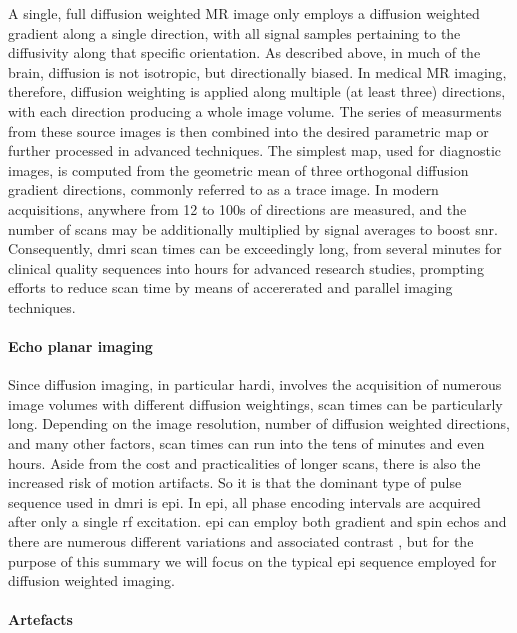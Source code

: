 A single, full diffusion weighted MR image only employs a diffusion weighted gradient along a single direction, with all signal samples pertaining to the diffusivity along that specific orientation.
As described above, in much of the brain, diffusion is not isotropic, but directionally biased.
In medical MR imaging, therefore, diffusion weighting is applied along multiple (at least three) directions, with each direction producing a whole image volume.
The series of measurments from these source images is then combined into the desired parametric map or further processed in advanced techniques.
The simplest map, used for diagnostic images, is computed from the geometric mean of three orthogonal diffusion gradient directions, commonly referred to as a trace image.
In modern acquisitions, anywhere from 12 to 100s of directions are measured, and the number of scans may be additionally multiplied by signal averages  to boost \gls{snr}.
Consequently, \Gls{dmri} scan times can be exceedingly long, from several minutes for clinical quality sequences into hours for advanced research studies, prompting efforts to reduce scan time by means of accererated and parallel imaging techniques.

\paragraph*{Echo planar imaging}

Since diffusion imaging, in particular \gls{hardi}, involves the acquisition of numerous image volumes with different diffusion weightings, scan times can be particularly long.
Depending on the image resolution, number of diffusion weighted directions, and many other factors, scan times can run into the tens of minutes and even hours.
Aside from the cost and practicalities of longer scans, there is also the increased risk of motion artifacts.
So it is that the dominant  type of pulse sequence used in \gls{dmri} is \gls{epi}.
In \gls{epi}, all phase encoding intervals are acquired after only a single \gls{rf} excitation.
\Gls{epi} can employ both gradient and spin echos and there are numerous different variations and associated contrast , but for the purpose of this summary we will focus on the typical \gls{epi} sequence employed for diffusion weighted imaging.

\paragraph*{Artefacts}

